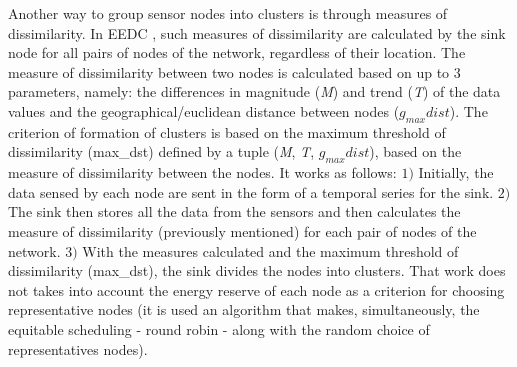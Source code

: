 \documentclass[conference]{IEEEtran}
\begin{document}
Another way to group sensor nodes into clusters is through measures of
dissimilarity.
In EEDC \cite{Liu2007}, such measures of dissimilarity are calculated by the
sink node for all pairs of nodes of the network, regardless of their location.
The measure of dissimilarity between two nodes is calculated based on up to $3$
parameters, namely:
the differences in magnitude (\textit{M}) and trend (\textit{T}) of the data
values and the geographical/euclidean distance between nodes ($g_{max}dist$).
The criterion of formation of clusters is based on the maximum threshold of
dissimilarity (max\_dst) defined by a tuple (\textit{M}, \textit{T},
$g_{max}dist$), based on the measure of dissimilarity between the nodes. It
works as follows: $1)$ Initially, the data sensed by each node are sent in the
form of a temporal series for the sink. $2)$ The sink then stores all the data
from the sensors and then calculates the measure of dissimilarity (previously
mentioned) for each pair of nodes of the network. $3)$ With the measures
calculated and the maximum threshold of dissimilarity (max\_dst), the sink
divides the nodes into clusters. 
That work does not takes into account the energy reserve of each node as a
criterion for choosing representative nodes (it is used an algorithm that makes,
simultaneously, the equitable scheduling - round robin - along with the random
choice of representatives nodes).
\end{document}
